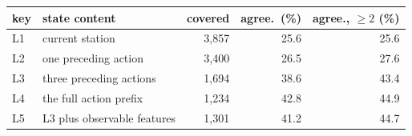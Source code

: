 {\setlength{\tabcolsep}{4.5pt}\begin{tabular}{llrrr}\toprule
key & state content & covered & agree.\ (\%) & agree., $\ge 2$ (\%) \\\midrule
L1 & current station & 3{,}857 & 25.6 & 25.6 \\
L2 & one preceding action & 3{,}400 & 26.5 & 27.6 \\
L3 & three preceding actions & 1{,}694 & 38.6 & 43.4 \\
L4 & the full action prefix & 1{,}234 & 42.8 & 44.9 \\
L5 & L3 plus observable features & 1{,}301 & 41.2 & 44.7 \\
\bottomrule\end{tabular}}
